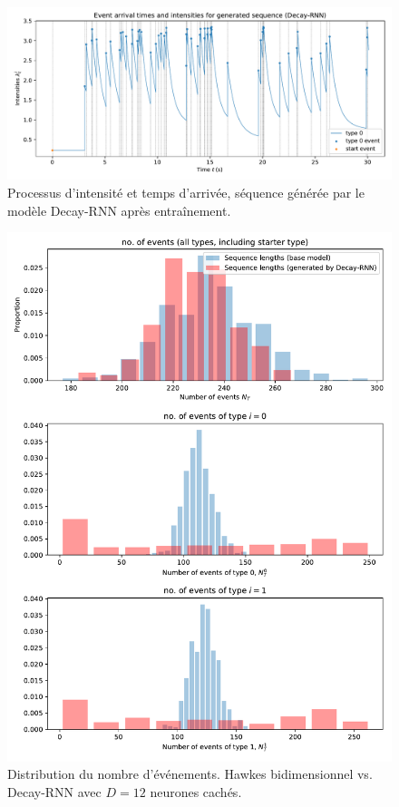 \documentclass[../main.tex]{subfiles}
\begin{document}
\begin{figure}[htp]
	\includegraphics[width=\linewidth]{../results/intensity_Decay-RNN_1d_hidden6_20181201-220235.pdf}
	\caption{Processus d'intensité et temps d'arrivée, séquence générée par le modèle Decay-RNN après entraînement.}\label{fig:hawkes1DRNNintensityPlot}
\end{figure}

\begin{figure}[htp]
	\includegraphics[width=\linewidth]{../results/seq_length_distrib_Decay-RNN-2d-hidden_12-20181201-003410.pdf}
	\caption{Distribution du nombre d'événements. Hawkes bidimensionnel vs. Decay-RNN avec $D=12$ neurones cachés.}\label{fig:hawkes2DDecayRNNlengthDistrib}
\end{figure}
\end{document}
